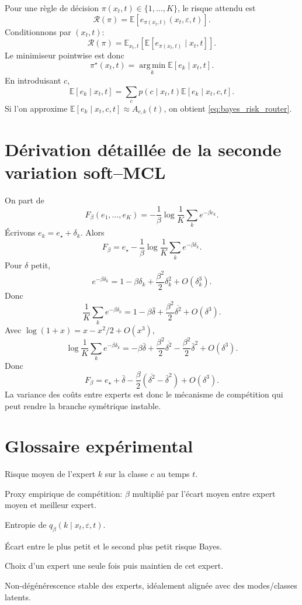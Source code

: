 \documentclass[11pt,a4paper]{article}
\newcommand{\E}{\mathbb{E}}
\newcommand{\argmin}{\operatorname*{arg\,min}}
\newcommand{\1}{\mathbf{1}}
\newcommand{\eps}{\varepsilon}
\newcommand{\xt}{x_t}
\begin{document}
Pour une règle de décision $\pi(\xt,t)\in\{1,\dots,K\}$, le risque attendu est
\[
\mathcal R(\pi)=\E[e_{\pi(\xt,t)}(\xt,\eps,t)].
\]
Conditionnons par $(\xt,t)$:
\[
\mathcal R(\pi)=\E_{\xt,t}\left[\E[e_{\pi(\xt,t)}\mid\xt,t]\right].
\]
Le minimiseur pointwise est donc
\[
\pi^\star(\xt,t)=\argmin_k\E[e_k\mid\xt,t].
\]
En introduisant $c$,
\[
\E[e_k\mid\xt,t]=\sum_c p(c\mid\xt,t)\E[e_k\mid\xt,c,t].
\]
Si l'on approxime $\E[e_k\mid\xt,c,t]\approx A_{c,k}(t)$, on obtient \eqref{eq:bayes_risk_router}.

\section{Dérivation détaillée de la seconde variation soft--MCL}

On part de
\[
F_\beta(e_1,\dots,e_K)=-\frac1\beta\log\frac1K\sum_k e^{-\beta e_k}.
\]
Écrivons $e_k=e_\star+\delta_k$. Alors
\[
F_\beta=e_\star-\frac1\beta\log\frac1K\sum_k e^{-\beta\delta_k}.
\]
Pour $\delta$ petit,
\[
e^{-\beta\delta_k}=1-\beta\delta_k+\frac{\beta^2}{2}\delta_k^2+O(\delta_k^3).
\]
Donc
\[
\frac1K\sum_k e^{-\beta\delta_k}=1-\beta\bar\delta+\frac{\beta^2}{2}\overline{\delta^2}+O(\delta^3).
\]
Avec $\log(1+x)=x-x^2/2+O(x^3)$,
\[
\log\frac1K\sum_k e^{-\beta\delta_k}
=-\beta\bar\delta+\frac{\beta^2}{2}\overline{\delta^2}-\frac{\beta^2}{2}\bar\delta^2+O(\delta^3).
\]
Donc
\[
F_\beta=e_\star+\bar\delta-\frac\beta2(\overline{\delta^2}-\bar\delta^2)+O(\delta^3).
\]
La variance des coûts entre experts est donc le mécanisme de compétition qui peut rendre la branche symétrique instable.

\section{Glossaire expérimental}

\begin{description}[leftmargin=2.5cm]
\item[$A_{c,k}$] Risque moyen de l'expert $k$ sur la classe $c$ au temps $t$.
\item[$\beta$-gap] Proxy empirique de compétition: $\beta$ multiplié par l'écart moyen entre expert moyen et meilleur expert.
\item[Teacher entropy] Entropie de $q_\beta(k\mid\xt,\eps,t)$.
\item[Risk margin] Écart entre le plus petit et le second plus petit risque Bayes.
\item[Commit] Choix d'un expert une seule fois puis maintien de cet expert.
\item[Spéciation] Non-dégénérescence stable des experts, idéalement alignée avec des modes/classes latents.
\end{description}
\end{document}

